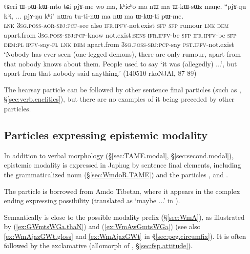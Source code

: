 \begin{exe}
\ex \label{ex:khicho}
\gll  tɕeri ɯ-pɯ-kɯ-mto tɕi pjɤ-me wo ma, kʰicʰo ma nɯ ma ɯ-kɯ-sɯz maŋe. ``pjɤ-ŋu kʰi, ... pjɤ-ŋu kʰi" nɯra tu-ti-nɯ ma nɯ ma ɯ-kɯ-ti pɯ-me. \\
\textsc{lnk} \textsc{3sg}.\textsc{poss}-\textsc{aor}-\textsc{sbj}:\textsc{pcp}-see also \textsc{ifr}.\textsc{ipfv}-not.exist \textsc{sfp} \textsc{sfp} rumour \textsc{lnk} \textsc{dem} apart.from \textsc{3sg}.\textsc{poss}-\textsc{sbj}:\textsc{pcp}-know not.exist:\textsc{sens}  \textsc{ifr}.\textsc{ipfv}-be \textsc{sfp} {   } \textsc{ifr}.\textsc{ipfv}-be \textsc{sfp} \textsc{dem}:\textsc{pl} \textsc{ipfv}-say-\textsc{pl} \textsc{lnk} \textsc{dem} apart.from \textsc{3sg}.\textsc{poss}-\textsc{sbj}:\textsc{pcp}-say \textsc{pst}.\textsc{ipfv}-not.exist \\
\glt `Nobody has ever seen (one-legged demons), there are only rumour, apart from that nobody knows about them. People used to say `it was (allegedly) ...', but apart from that nobody said anything.' (140510 rkoNJAl, 87-89)
 \end{exe}
 
The hearsay particle can be followed by other sentence final particles (such as , §\ref{sec:verb.enclitics}), but there are no examples of it being preceded by other particles.
 
\subsection{Particles expressing epistemic modality} \label{sec:fsp.epistemic}
In addition to verbal morphology (§\ref{sec:TAME.modal}, §\ref{sec:second.modal}), epistemic modality is expressed in Japhug by sentence final elements, including the grammaticalized noun  (§\ref{sec:WmdoR.TAME}) and the particles ,  and .

The particle  is borrowed from Amdo Tibetan, where it appears in the complex ending  expressing possibility (translated as  `maybe ...' in \citealt[306--307]{ebihara19amdo}). 

Semantically  is close to the possible modality prefix (§\ref{sec:WmA}), as illustrated by (\ref{ex:GWmtsWGa.thaN}) and (\ref{ex:WmAwGmtsWGa}) (see also  \ref{ex:WmAjazGWt.gloss} and \ref{ex:WmAjazGWt} in §\ref{sec:peg.circumfix}). It is often followed by the exclamative  (allomorph of , §\ref{sec:fsp.attitude}).
  
